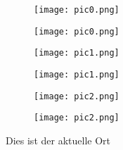 \documentclass[10pt,a6paper,DIV=60]{scrartcl}
\begin{document}
\begin{figure}[h]
  \begin{minipage}[b]{0.48\linewidth}
    \texttt{[image: pic0.png]}
  \end{minipage}
  \hfill
  \begin{minipage}[b]{0.48\linewidth}
    \texttt{[image: pic0.png]}
  \end{minipage}
\end{figure}
\vspace{-1em}
\begin{figure}[h]
  \begin{minipage}[b]{0.48\linewidth}
    \texttt{[image: pic1.png]}
  \end{minipage}
  \hfill
  \begin{minipage}[b]{0.48\linewidth}
    \texttt{[image: pic1.png]}
  \end{minipage}
\end{figure}
\vspace{-1em}
\begin{figure}[h]
  \begin{minipage}[b]{0.48\linewidth}
    \texttt{[image: pic2.png]}
  \end{minipage}
  \hfill
  \begin{minipage}[b]{0.48\linewidth}
    \texttt{[image: pic2.png]}
  \end{minipage}
\end{figure}
\vfill
\tiny{Dies ist der aktuelle Ort}
\end{document}
